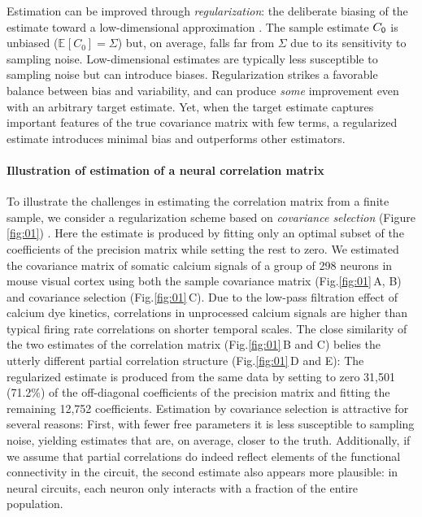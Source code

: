 \documentclass[10pt]{article}
\newcommand{\figref}[2]{Fig.\;\ref{fig:#1}\,#2}
\newcommand{\E}[2][]{\mathbb E_{#1}\left[ #2\right]}    %
\begin{document}
Estimation can be improved through \emph{regularization}: the deliberate biasing of the estimate toward a low-dimensional approximation \cite{Schafer:2005,Bickel:2006}.  The sample estimate $C_{\sf 0}$ is unbiased ($\E{C_0}=\Sigma$) but, on average, falls far from $\Sigma$ due to its sensitivity to sampling noise.  Low-dimensional estimates are typically less susceptible to sampling noise but can introduce biases.  Regularization strikes a favorable balance between bias and variability, and can produce \emph{some} improvement even with an arbitrary target estimate.  Yet, when the target estimate captures important features of the true covariance matrix with few terms, a regularized estimate introduces minimal bias and outperforms other estimators. 

\paragraph{Illustration of estimation of a neural correlation matrix}
To illustrate the challenges in estimating the correlation matrix from a finite sample, we consider a regularization scheme based on \emph{covariance selection} (Figure \ref{fig:01}) \cite{Dempster:1972}. Here the estimate is produced by fitting only an optimal subset of the coefficients of the precision matrix while setting the rest to zero. We estimated the covariance matrix of somatic calcium signals of a group of 298 neurons in mouse visual cortex using both the sample covariance matrix (\figref{01}{A, B}) and covariance selection (\figref{01}{C}). Due to the low-pass filtration effect of calcium dye kinetics, correlations in unprocessed calcium signals are higher than typical firing rate correlations on shorter temporal scales. The close similarity of the two estimates of the correlation matrix (\figref{01}{B and C}) belies the utterly different partial correlation structure (\figref{01}{D and E}): The regularized estimate is produced from the same data by setting to zero 31,501 (71.2\%) of the off-diagonal coefficients of the precision matrix and fitting the remaining 12,752 coefficients. Estimation by covariance selection is attractive for several reasons: First, with fewer free parameters it is less susceptible to sampling noise, yielding estimates that are, on average, closer to the truth. Additionally, if we assume that partial correlations do indeed reflect elements of the functional connectivity in the circuit, the second estimate also appears more plausible: in neural circuits, each neuron only interacts with a fraction of the entire population.
\end{document}

